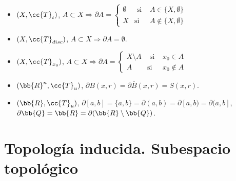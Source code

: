 \begin{ejemplo}\
    \begin{itemize}
        \item $(X, \cc{T}_t)$, $A\subset X \Rightarrow \partial A = \left\{
        \begin{array}{ccc}
            \emptyset & \text{ si } & A \in \{X, \emptyset\}\\
            X & \text{si} & A\notin \{X, \emptyset\}
        \end{array}
        \right.$
        \item $(X, \cc{T}_{disc})$, $A\subset X \Rightarrow \partial A = \emptyset$.
        \item $(X, \cc{T}_{x_0})$, $A\subset X \Rightarrow \partial A = \left\{
        \begin{array}{ccc}
            X\setminus A & \text{ si } & x_0\in A\\
            A & \text{si} & x_0 \notin A
        \end{array}
        \right.$
        \item $(\bb{R}^n, \cc{T}_u)$, $\partial B(x, r) = \partial \overline{B}(x,r) = S(x,r)$.
        \item $(\bb{R}, \cc{T}_u)$, $\partial [a,b] = \{a,b\} = \partial (a,b) = \partial [a,b) = \partial (a,b]$, $\partial \bb{Q} = \bb{R} = \partial(\bb{R}\setminus \bb{Q})$.
    \end{itemize}
\end{ejemplo}

\section{Topología inducida. Subespacio topológico}


